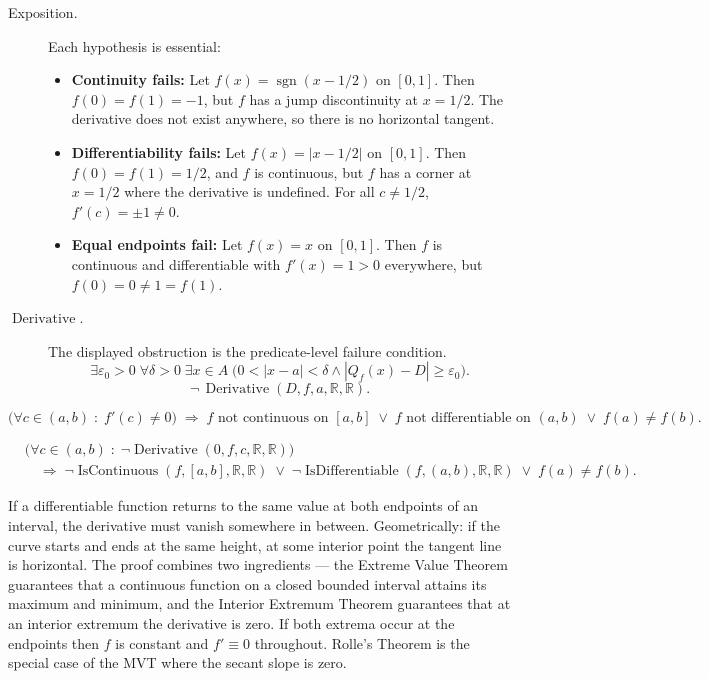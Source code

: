 \begin{remark*}
\begin{description}
  \item[Exposition.]
Each hypothesis is essential:
\begin{itemize}
  \item \textbf{Continuity fails:} Let $f(x) = \operatorname{sgn}(x - 1/2)$ on $[0,1]$. Then $f(0) = f(1) = -1$, but $f$ has a jump discontinuity at $x = 1/2$. The derivative does not exist anywhere, so there is no horizontal tangent.
  \item \textbf{Differentiability fails:} Let $f(x) = |x - 1/2|$ on $[0,1]$. Then $f(0) = f(1) = 1/2$, and $f$ is continuous, but $f$ has a corner at $x = 1/2$ where the derivative is undefined. For all $c \ne 1/2$, $f'(c) = \pm 1 \ne 0$.
  \item \textbf{Equal endpoints fail:} Let $f(x) = x$ on $[0,1]$. Then $f$ is continuous and differentiable with $f'(x) = 1 > 0$ everywhere, but $f(0) = 0 \ne 1 = f(1)$.
\end{itemize}


  \item[\(\operatorname{Derivative}.\)]
  The displayed obstruction is the predicate-level failure condition.
  \[
  \exists\varepsilon_0>0\;\forall\delta>0\;\exists x\in A\;\bigl(0<|x-a|<\delta\land |Q_f(x)-D|\ge\varepsilon_0\bigr).
  \]
  \[
  \neg\,\operatorname{Derivative}(D,f,a,\mathbb{R},\mathbb{R}).
  \]
\end{description}
\end{remark*}

\begin{remark*}[Interpretation]
\[
\bigl(\forall c \in (a,b)\;:\; f'(c) \ne 0\bigr)
\;\Rightarrow\;
f \text{ not continuous on } [a,b]
\;\lor\;
f \text{ not differentiable on } (a,b)
\;\lor\;
f(a) \ne f(b).
\]


\begin{align*}
&\bigl(\forall c\in(a,b)\;:\;\neg\operatorname{Derivative}(0,f,c,\mathbb{R},\mathbb{R})\bigr)\\
&\quad\Longrightarrow\;
\neg\operatorname{IsContinuous}(f,[a,b],\mathbb{R},\mathbb{R})
\;\lor\;
\neg\operatorname{IsDifferentiable}(f,(a,b),\mathbb{R},\mathbb{R})
\;\lor\;
f(a)\ne f(b).
\end{align*}


If a differentiable function returns to the same value at both endpoints of an interval, the derivative must vanish somewhere in between. Geometrically: if the curve starts and ends at the same height, at some interior point the tangent line is horizontal. The proof combines two ingredients --- the Extreme Value Theorem guarantees that a continuous function on a closed bounded interval attains its maximum and minimum, and the Interior Extremum Theorem guarantees that at an interior extremum the derivative is zero. If both extrema occur at the endpoints then $f$ is constant and $f' \equiv 0$ throughout. Rolle's Theorem is the special case of the MVT where the secant slope is zero.
\end{remark*}

